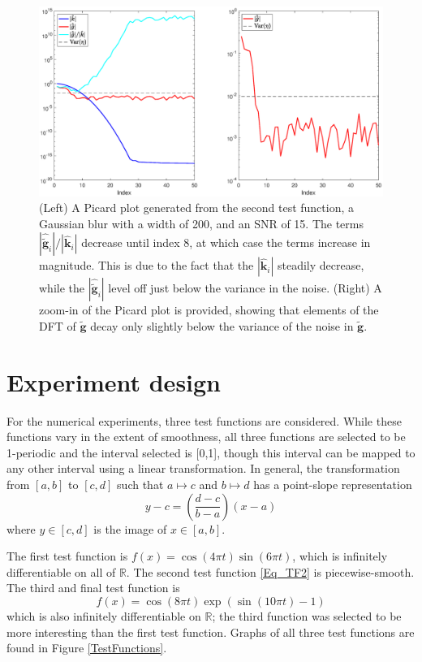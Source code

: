 \documentclass[12pt]{article}
\newcommand{\fcon}{f}
\newcommand{\gnoise}{\widetilde{\mathbf{g}}}
\newcommand{\kdis}{\mathbf{k}}
\begin{document}
\begin{figure}
	\centerline{\includegraphics[scale = 0.45]{Figures/PicardPlot1D_F2_S15_W200.eps}}
\caption{(Left) A Picard plot generated from the second test function, a Gaussian blur with a width of 200, and an SNR of 15. The terms $|\widehat{\gnoise}_i|/|\widehat{\kdis}_i|$ decrease until index 8, at which case the terms increase in magnitude. This is due to the fact that the $|\widehat{\kdis}_i|$ steadily decrease, while the $|\widehat{\gnoise}_i|$ level off just below the variance in the noise. (Right) A zoom-in of the Picard plot is provided, showing that elements of the DFT of $\gnoise$ decay only slightly below the variance of the noise in $\gnoise$.}
\label{PicardPlot}
\end{figure}

\section{Experiment design} \label{Experiment design}

For the numerical experiments, three test functions are considered. While these functions vary in the extent of smoothness, all three functions are selected to be 1-periodic and the interval selected is [0,1], though this interval can be mapped to any other interval using a linear transformation. In general, the transformation from $[a,b]$ to $[c,d]$ such that $a \mapsto c$ and $b \mapsto d$ has a point-slope representation
\[y - c = \left(\frac{d-c}{b-a}\right)(x - a)\]
where $y \in [c,d]$ is the image of $x \in [a,b]$. \par
The first test function is $\fcon(x) = \cos(4\pi{t})\sin(6\pi{t})$, which is infinitely differentiable on all of $\mathbb{R}$. The second test function \eqref{Eq_TF2} is piecewise-smooth. The third and final test function is
\begin{equation}
\fcon(x) = \cos(8\pi{t})\exp(\sin(10\pi{t})-1)
\label{Eq_TF3}
\end{equation}
which is also infinitely differentiable on $\mathbb{R}$; the third function was selected to be more interesting than the first test function. Graphs of all three test functions are found in Figure \ref{TestFunctions}.  \par
\end{document}
